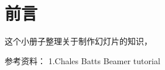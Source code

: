 \documentclass[11pt,oneside]{book}
\begin{document}
\frontmatter

\author{万泽}
\titleLA

\chapter*{前言}
\begin{common-format}
这个小册子整理关于制作幻灯片的知识，

参考资料：
1.Chales Batts Beamer tutorial


\end{common-format}


\setcounter{tocdepth}{2}
\tableofcontents
\end{document}
